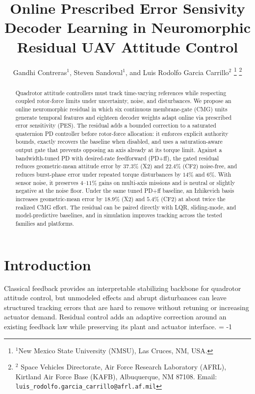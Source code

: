 \documentclass[letterpaper, 10 pt, conference]{ieeeconf}
\title{\LARGE \bf Online Prescribed Error Sensivity Decoder Learning in Neuromorphic Residual UAV Attitude Control}
\author{Gandhi Contreras$^{1}$, Steven Sandoval$^{1}$, and Luis Rodolfo Garcia Carrillo$^{2}$%
\thanks{$^{1}$New Mexico State University (NMSU), Las Cruces, NM, USA.}%
\thanks{$^{2}$ Space Vehicles Directorate, Air Force Research Laboratory (AFRL), Kirtland Air Force Base (KAFB), Albuquerque, NM 87108.
    Email: {\tt\small luis\_rodolfo.garcia\_carrillo@afrl.af.mil}}%
}
\begin{document}
\maketitle



\begin{abstract}
Quadrotor attitude controllers must track time-varying references while respecting coupled rotor-force limits under uncertainty, noise, and disturbances. We propose an online neuromorphic residual in which six continuous membrane-gate (CMG) units generate temporal features and eighteen decoder weights adapt online via prescribed error sensitivity (PES).
%
The residual adds a bounded correction to a saturated quaternion PD controller before rotor-force allocation: it enforces explicit authority bounds, exactly recovers the baseline when disabled, and uses a saturation-aware output gate that prevents opposing an axis already at its torque limit.
%
Against a bandwidth-tuned PD with desired-rate feedforward (PD+ff), the gated residual reduces geometric-mean attitude error by $37.3\%$ (X2) and $22.4\%$ (CF2) noise-free, and reduces burst-phase error under repeated torque disturbances by $14\%$ and $6\%$. With sensor noise, it preserves $4$--$11\%$ gains on multi-axis missions and is neutral or slightly negative at the noise floor.
Under the same tuned PD+ff baseline, an Izhikevich basis increases geometric-mean error by $18.9\%$ (X2) and $5.4\%$ (CF2) at about twice the realized CMG effort.
The residual can be paired directly with LQR, sliding-mode, and model-predictive baselines, and in simulation improves tracking across the tested families and platforms.
\end{abstract}


\section{Introduction}
Classical feedback provides an interpretable stabilizing backbone for quadrotor attitude control, but unmodeled effects and abrupt disturbances can leave structured tracking errors that are hard to remove without retuning or increasing actuator demand. Residual control adds an adaptive correction around an existing feedback law while preserving its plant and actuator interface. \looseness = -1
\end{document}
